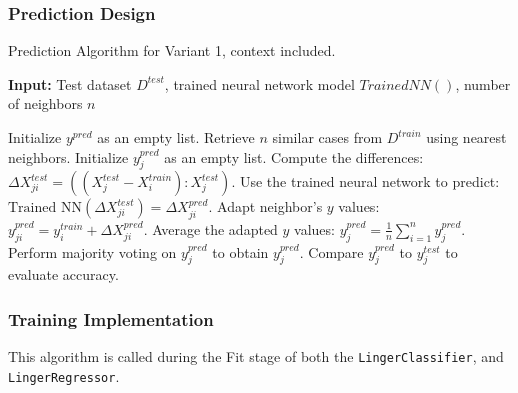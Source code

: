 \documentclass[a4paper, 12pt]{report}
\begin{document}
\subsubsection{Prediction Design}
\begin{algorithm}[H]
	\caption{Prediction Algorithm for Variant 1, context included.}
	\label{alg:prediction_variant_1}
	\textbf{Input:} Test dataset $D^{test}$, trained neural network model $Trained NN()$, number of neighbors $n$
	\begin{algorithmic}[1]
        \State Initialize $y^{pred}$ as an empty list.
			\State Retrieve $n$ similar cases from $D^{train}$ using nearest neighbors.
			\State Initialize $y^{pred}_j$ as an empty list.
				\State Compute the differences: $\Delta X^{test}_{ji} = ((X^{test}_j - X^{train}_i):X^{test}_j)$.
				\State Use the trained neural network to predict: $\text{Trained NN}(\Delta X^{test}_{ji}) = \Delta X^{pred}_{ji}$.
				\State Adapt neighbor's $y$ values: $y^{pred}_{ji} = y^{train}_i + \Delta X^{pred}_{ji}$.
			\EndFor
				\State Average the adapted $y$ values: $y^{pred}_j = \frac{1}{n} \sum_{i=1}^{n} y^{pred}_{j}$.
				\State Perform majority voting on $y^{pred}_j$ to obtain $y^{pred}_j$.
			\EndIf
		\EndFor
		\State Compare $y^{pred}_j$ to $y^{test}_j$ to evaluate accuracy.
	\end{algorithmic}
\end{algorithm}

\subsubsection{Training Implementation}
This algorithm is called during the Fit stage of both the \texttt{LingerClassifier}, and \texttt{LingerRegressor}.
\end{document}

